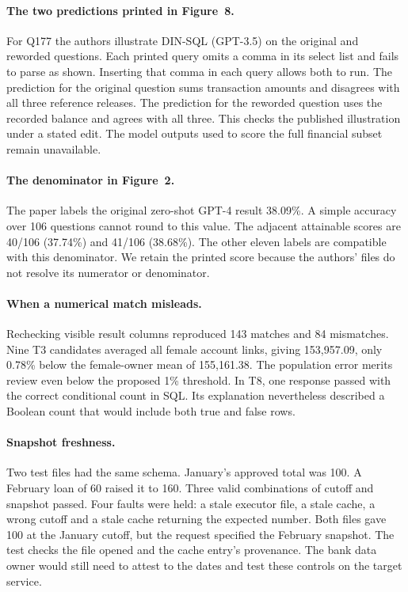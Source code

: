 \paragraph{The two predictions printed in Figure~8.}
For Q177 the authors illustrate DIN-SQL (GPT-3.5) on the original and reworded questions. Each printed query omits a comma in its select list and fails to parse as shown. Inserting that comma in each query allows both to run. The prediction for the original question sums transaction amounts and disagrees with all three reference releases. The prediction for the reworded question uses the recorded balance and agrees with all three. This checks the published illustration under a stated edit. The model outputs used to score the full financial subset remain unavailable.

\paragraph{The denominator in Figure~2.}
The paper labels the original zero-shot GPT-4 result 38.09\%. A simple accuracy over 106 questions cannot round to this value. The adjacent attainable scores are 40/106 (37.74\%) and 41/106 (38.68\%). The other eleven labels are compatible with this denominator. We retain the printed score because the authors' files do not resolve its numerator or denominator.

\paragraph{When a numerical match misleads.}
Rechecking visible result columns reproduced 143 matches and 84 mismatches. Nine T3 candidates averaged all female account links, giving 153,957.09, only 0.78\% below the female-owner mean of 155,161.38. The population error merits review even below the proposed 1\% threshold. In T8, one response passed with the correct conditional count in SQL. Its explanation nevertheless described a Boolean count that would include both true and false rows.

\paragraph{Snapshot freshness.}
Two test files had the same schema. January's approved total was 100. A February loan of 60 raised it to 160. Three valid combinations of cutoff and snapshot passed. Four faults were held: a stale executor file, a stale cache, a wrong cutoff and a stale cache returning the expected number. Both files gave 100 at the January cutoff, but the request specified the February snapshot. The test checks the file opened and the cache entry's provenance. The bank data owner would still need to attest to the dates and test these controls on the target service.
